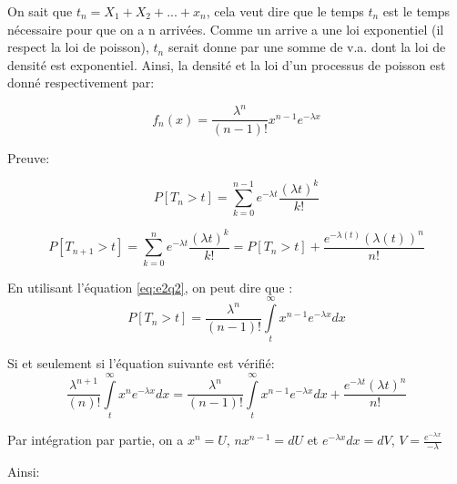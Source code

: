 \documentclass[a4paper]{article}
\begin{document}
On sait que $t_n= X_1 + X_2+ ...+ x_n$, cela veut dire que le temps $t_n$ est le
temps nécessaire pour que on a n arrivées. Comme un arrive a une loi exponentiel
(il respect la loi de poisson), $t_n$ serait donne par une somme de v.a. dont la
loi de  densité est exponentiel. Ainsi, la  densité et la loi  d'un processus de
poisson est donné respectivement par:

\begin{equation}
f_n(x)=\frac{\lambda^{n}}{(n-1)!}x^{n-1}e^{-\lambda x}
\end{equation}

Preuve:


\begin{equation} 
P[T_n > t] = \sum_{k=0}^{n-1}e^{-\lambda t}\frac{(\lambda t)^k}{k!}
\end{equation}

\begin{equation}\label{eq:e2q2}
P[T_{n+1} >  t] = \sum_{k=0}^{n}e^{-\lambda t}\frac{(\lambda  t)^k}{k!}= P[T_n >
t]+ \frac{e^{-\lambda (t)}(\lambda (t))^n}{n!}
\end{equation}

En utilisant l'équation \ref{eq:e2q2}, on peut dire que :
\begin{equation} 
P[T_n  > t] =  \frac{\lambda^{n}}{(n-1)!}\int\limits_t^\infty x^{n-1}e^{-\lambda
  x}dx
\end{equation}

Si et seulement si l'équation suivante est vérifié:
\begin{equation} 
\frac{\lambda^{n+1}}{(n)!}\int\limits_t^\infty x^{n}e^{-\lambda
  x}dx = \frac{\lambda^{n}}{(n-1)!}\int\limits_t^\infty x^{n-1}e^{-\lambda
  x}dx +  \frac{e^{-\lambda t}(\lambda t)^n}{n!}
\end{equation}

Par intégration  par partie,  on a $  x^n =  U$, $nx^{n-1}=dU$ et  $ e^{-\lambda
  x}dx=dV$, $V=\frac{e^{-\lambda x}}{-\lambda}$

Ainsi:

\end{document}
